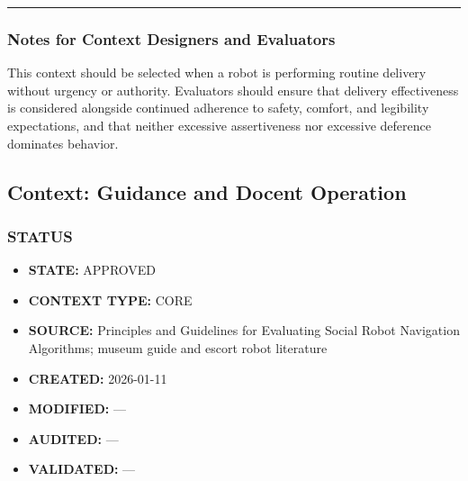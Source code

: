 \documentclass[utf8]{frontiers_suppmat} %
\newenvironment{Shaded}{\begin{shaded}}{\end{shaded}}
\providecommand{\tightlist}{%
  \setlength{\itemsep}{0pt}\setlength{\parskip}{0pt}}
\begin{document}
\begin{Shaded}
\begin{Highlighting}[]
\KeywordTok{:}
\AttributeTok{  }\KeywordTok{:}
\AttributeTok{    }\KeywordTok{{-}}
\AttributeTok{    }\KeywordTok{{-}}
\AttributeTok{  }\KeywordTok{:}
\AttributeTok{    }\KeywordTok{{-}}
\AttributeTok{    }\KeywordTok{{-}}

\KeywordTok{:}
\AttributeTok{  }\KeywordTok{{-}}
\AttributeTok{  }\KeywordTok{{-}}
\AttributeTok{  }\KeywordTok{{-}}
\end{Highlighting}
\end{Shaded}

\begin{center}\rule{0.5\linewidth}{0.5pt}\end{center}

\subsubsection{Notes for Context Designers and
Evaluators}\label{notes-for-context-designers-and-evaluators}

This context should be selected when a robot is performing routine
delivery without urgency or authority. Evaluators should ensure that
delivery effectiveness is considered alongside continued adherence to
safety, comfort, and legibility expectations, and that neither excessive
assertiveness nor excessive deference dominates behavior.


\subsection{Context: Guidance and Docent
Operation}\label{context-guidance-and-docent-operation}

\subsubsection{STATUS}\label{status}

\begin{itemize}
\tightlist
\item
  \textbf{STATE:} APPROVED
\item
  \textbf{CONTEXT TYPE:} CORE
\item
  \textbf{SOURCE:} Principles and Guidelines for Evaluating Social Robot
  Navigation Algorithms; museum guide and escort robot literature
\item
  \textbf{CREATED:} 2026-01-11
\item
  \textbf{MODIFIED:} ---
\item
  \textbf{AUDITED:} ---
\item
  \textbf{VALIDATED:} ---
\end{itemize}
\end{document}
